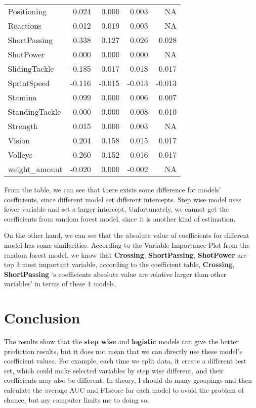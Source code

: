 \documentclass[
]{article}
\begin{document}
\begin{longtable}[]{@{}lrrrr@{}}
Positioning & 0.024 & 0.000 & 0.003 & NA \\
Reactions & 0.012 & 0.019 & 0.003 & NA \\
ShortPassing & 0.338 & 0.127 & 0.026 & 0.028 \\
ShotPower & 0.000 & 0.000 & 0.000 & NA \\
SlidingTackle & -0.185 & -0.017 & -0.018 & -0.017 \\
SprintSpeed & -0.116 & -0.015 & -0.013 & -0.013 \\
Stamina & 0.099 & 0.000 & 0.006 & 0.007 \\
StandingTackle & 0.000 & 0.000 & 0.008 & 0.010 \\
Strength & 0.015 & 0.000 & 0.003 & NA \\
Vision & 0.204 & 0.158 & 0.015 & 0.017 \\
Volleys & 0.260 & 0.152 & 0.016 & 0.017 \\
weight\_amount & -0.020 & 0.000 & -0.002 & NA \\
\bottomrule
\end{longtable}

From the table, we can see that there exists some difference for models'
coefficients, since different model set different intercepts. Step wise
model uses fewer variable and set a larger intercept. Unfortunately, we
cannot get the coefficients from random forest model, since it is
another kind of estimation.

On the other hand, we can see that the absolute value of coefficients
for different model has some similarities. According to the Variable
Importance Plot from the random forest model, we know that
\textbf{Crossing}, \textbf{ShortPassing}, \textbf{ShotPower} are top 3
most important variable, according to the coefficient table,
\textbf{Crossing}, \textbf{ShortPassing} `s coefficients absolute value
are relative larger than other variables' in terms of these 4 models.

\hypertarget{conclusion}{%
\section{Conclusion}\label{conclusion}}

The results show that the \textbf{step wise} and \textbf{logistic}
models can give the better prediction results, but it does not mean that
we can directly use these model's coefficient values. For example, each
time we split data, it create a different test set, which could make
selected variables by step wise different, and their coefficients may
also be different. In theory, I should do many groupings and then
calculate the average AUC and F1score for each model to avoid the
problem of chance, but my computer limits me to doing so.
\end{document}
